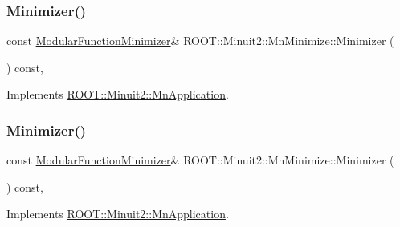 \subsubsection{\texorpdfstring{Minimizer()}{Minimizer()}\hspace{0.1cm}{\footnotesize\ttfamily [1/3]}}
{\footnotesize\ttfamily const \mbox{\hyperlink{classROOT_1_1Minuit2_1_1ModularFunctionMinimizer}{Modular\+Function\+Minimizer}}\& R\+O\+O\+T\+::\+Minuit2\+::\+Mn\+Minimize\+::\+Minimizer (\begin{DoxyParamCaption}{ }\end{DoxyParamCaption}) const\hspace{0.3cm}{\ttfamily [inline]}, {\ttfamily [virtual]}}



Implements \mbox{\hyperlink{classROOT_1_1Minuit2_1_1MnApplication_a5a8e1e2658b731b5f4023dd1b1594223}{R\+O\+O\+T\+::\+Minuit2\+::\+Mn\+Application}}.

\mbox{\label{classROOT_1_1Minuit2_1_1MnMinimize_a879bb789f98c72f9a90a327fc7bb48fd}} 
\subsubsection{\texorpdfstring{Minimizer()}{Minimizer()}\hspace{0.1cm}{\footnotesize\ttfamily [2/3]}}
{\footnotesize\ttfamily const \mbox{\hyperlink{classROOT_1_1Minuit2_1_1ModularFunctionMinimizer}{Modular\+Function\+Minimizer}}\& R\+O\+O\+T\+::\+Minuit2\+::\+Mn\+Minimize\+::\+Minimizer (\begin{DoxyParamCaption}{ }\end{DoxyParamCaption}) const\hspace{0.3cm}{\ttfamily [inline]}, {\ttfamily [virtual]}}



Implements \mbox{\hyperlink{classROOT_1_1Minuit2_1_1MnApplication_a5a8e1e2658b731b5f4023dd1b1594223}{R\+O\+O\+T\+::\+Minuit2\+::\+Mn\+Application}}.

\mbox{\label{classROOT_1_1Minuit2_1_1MnMinimize_a879bb789f98c72f9a90a327fc7bb48fd}} 
